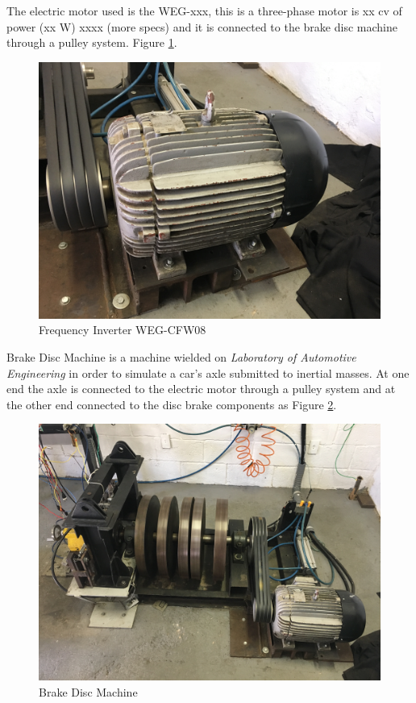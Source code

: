 		The electric motor used is the WEG-xxx, this is a three-phase motor is xx cv of power (xx W) xxxx (more specs) \cite{weg-motor} and it is connected to the brake disc machine through a pulley system. Figure \ref{fig:electric-motor}.

		\begin{figure}[htbp]
			\centering
			\includegraphics[scale=0.7]{figuras/fig-electric-motor}
			\caption{Frequency Inverter WEG-CFW08}
			\label{fig:electric-motor}
		\end{figure}
		\par

		Brake Disc Machine is a machine wielded on \textit{Laboratory of Automotive Engineering} in order to simulate a car's axle submitted to inertial masses. At one end the axle is connected to the electric motor through a pulley system and at the other end connected to the disc brake components as Figure \ref{fig:brake-disc-machine}.

		\begin{figure}[htbp]
			\centering
			\includegraphics[scale=0.7]{figuras/fig-brake-disc-machine}
			\caption{Brake Disc Machine}
			\label{fig:brake-disc-machine}
		\end{figure}
		\par

